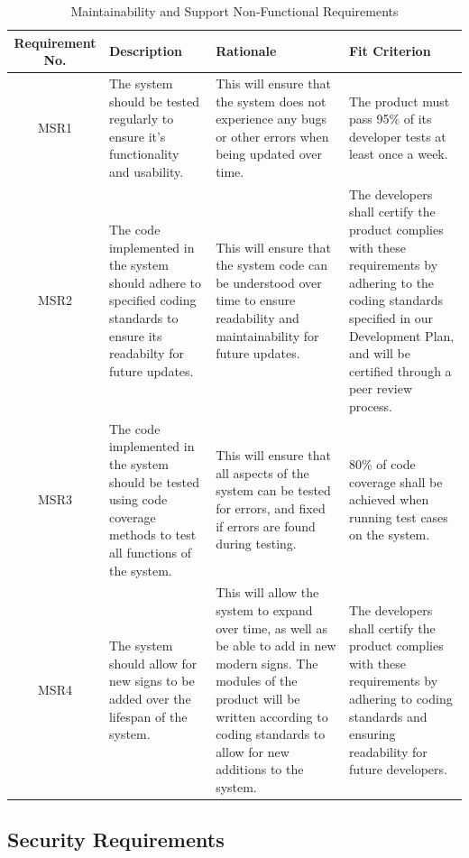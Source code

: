 \documentclass[12pt, titlepage]{article}
\begin{document}
\begin{longtable}{| c | p{3cm}| p{3cm}| p{3cm}|}
\caption{Maintainability and Support Non-Functional Requirements} \\
\hline 
\textbf{Requirement No.} & \textbf{Description} & \textbf{Rationale} & \textbf{Fit Criterion}\\
\hline
MSR1 & The system should be tested regularly to ensure it's functionality and usability. & This will ensure that the system does not experience any bugs or other errors when being updated over time. & The product must pass 95\% of its developer tests at least once a week. \\
\hline
MSR2 & The code implemented in the system should adhere to specified coding standards to ensure its readabilty for future updates. & This will ensure that the system code can be understood over time to ensure readability and maintainability for future updates. & The developers shall certify the product complies with these requirements by adhering to the coding standards specified in our Development Plan, and will be certified through a peer review process. \\
\hline
MSR3 & The code implemented in the system should be tested using code coverage methods to test all functions of the system. & This will ensure that all aspects of the system can be tested for errors, and fixed if errors are found during testing. & 80\% of code coverage shall be achieved when running test cases on the system. \\
\hline
MSR4 & The system should allow for new signs to be added over the lifespan of the system. & This will allow the system to expand over time, as well as be able to add in new modern signs. The modules of the product will be written according to coding standards to allow for new additions to the system. & The developers shall certify the product complies with these requirements by adhering to coding standards and ensuring readability for future developers. \\
\bottomrule
\end{longtable}

\subsection{Security Requirements}
\end{document}
